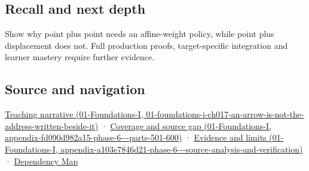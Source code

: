 \subsection{Recall and next depth}\label{appendix-0659864c0aa3-recall-and-next-depth}

Show why point plus point needs an affine-weight policy, while point plus displacement does not. Full production proofs, target-specific integration and learner mastery require further evidence.

\subsection{Source and navigation}\label{appendix-0659864c0aa3-source-and-navigation}

\href{../01-Foundations-I/main.pdf\#nameddest=01-foundations-i-ch017-an-arrow-is-not-the-address-written-beside-it}{Teaching narrative (01-Foundations-I, 01-foundations-i-ch017-an-arrow-is-not-the-address-written-beside-it)} · \href{../01-Foundations-I/main.pdf\#nameddest=appendix-fd090d982a15-phase-6---parts-501-600}{Coverage and source gap (01-Foundations-I, appendix-fd090d982a15-phase-6-\/-\/-parts-501-600)} · \href{../01-Foundations-I/main.pdf\#nameddest=appendix-a103e7846d21-phase-6---source-analysis-and-verification}{Evidence and limits (01-Foundations-I, appendix-a103e7846d21-phase-6-\/-\/-source-analysis-and-verification)} · \hyperref[appendix-4ad47bdd269a]{Dependency Map}
